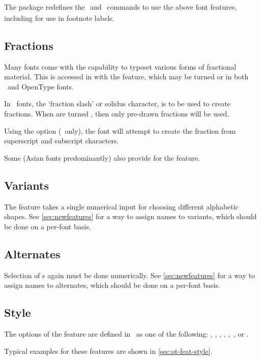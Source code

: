 \documentclass[a4paper]{l3doc}
\begin{document}
The  package redefines the \cmd\textsubscript\ and
\cmd\textsuperscript\ commands to use the above font features,
including for use in footnote labels.

\subsection{Fractions}
Many fonts come with the capability to typeset various forms of
fractional material. This is accessed in  with the
 feature, which may be turned  or 
in both \AAT\ and OpenType fonts.

In \AAT\ fonts, the `fraction slash' or solidus character, is
to be used to create fractions. When  are turned
, then only pre-drawn fractions will be used.

Using the  option (\AAT\ only), the font will attempt
to create the fraction from superscript and subscript
characters.

Some (Asian fonts predominantly) also provide for the
 feature.

\subsection{Variants}
The  feature takes a single numerical input for
choosing different alphabetic shapes.
See \vref{sec:newfeatures} for a way to assign names to variants,
which should be done on a per-font basis.

\subsection{Alternates}
Selection of s again must be done numerically.
See \vref{sec:newfeatures} for a way to assign names to alternates,
which should be done on a per-font basis.


\subsection{Style}
The options of the  feature
are defined in \AAT\ as one of the following: ,
, , ,
,\footnotemark\ , or .

Typical examples for these features are shown in \ref{sec:ot-feat-style}.
\end{document}
